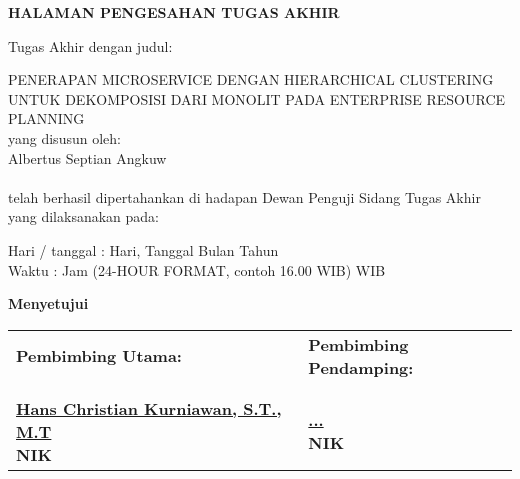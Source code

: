 \vspace*{0cm}

\begin{center}		
	{\large \bfseries HALAMAN PENGESAHAN TUGAS AKHIR \\}
\end{center}
		
\vspace{2cm}

\noindent Tugas Akhir dengan judul:

\noindent PENERAPAN MICROSERVICE DENGAN HIERARCHICAL CLUSTERING UNTUK DEKOMPOSISI DARI MONOLIT PADA ENTERPRISE RESOURCE PLANNING\\

\noindent yang disusun oleh: \\
\noindent Albertus Septian Angkuw \\
 \\

\noindent telah berhasil dipertahankan di hadapan Dewan Penguji Sidang Tugas Akhir yang dilaksanakan pada: 

\begin{tabs}{3cm}
	\noindent Hari / tanggal \tab : Hari, Tanggal Bulan Tahun \\
	\noindent Waktu \tab : Jam (24-HOUR FORMAT, contoh 16.00 WIB) WIB
\end{tabs}

\vspace{3.2cm}
\begin{center}	
\textbf{Menyetujui} \\
\end{center}

\begin{longtable}{p{6.5cm} p{6.5cm}}
	\centering \textbf{Pembimbing Utama:} &
	\centering \textbf{Pembimbing Pendamping:} \\
	
	\cr \\ \\
		
	\centering \textbf{ \underline{Hans Christian Kurniawan, S.T., M.T} \\ NIK} &
	\centering \textbf{ \underline{...} \\ NIK} \\
	
\end{longtable}